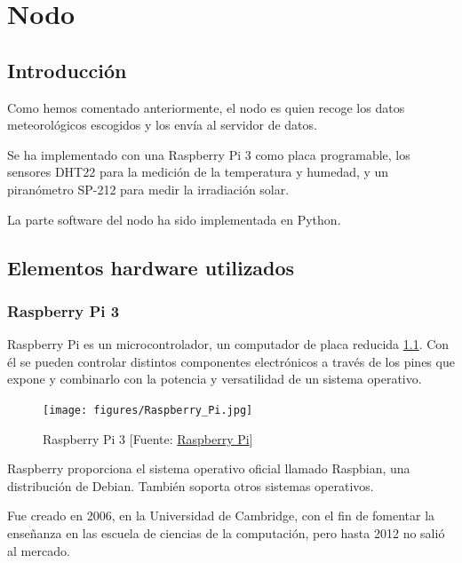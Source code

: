 \cleardoublepage

\chapter{Nodo}
\label{makereference3}

\section{Introducción}
\label{makereference3.1}
Como hemos comentado anteriormente, el nodo es quien recoge los datos meteorológicos escogidos y los envía al servidor de datos.

Se ha implementado con una Raspberry Pi 3 como placa programable, los sensores DHT22 para la medición de la temperatura y humedad, y un piranómetro SP-212 para medir la irradiación solar.

La parte software del nodo ha sido implementada en Python.

\section{Elementos hardware utilizados}
\label{makereference3.2}

\subsection{Raspberry Pi 3}
\label{makereference3.2.1}

Raspberry Pi es un microcontrolador, un computador de placa reducida \ref{rasp}. Con él se pueden controlar distintos componentes electrónicos a través de los pines que expone y combinarlo con la potencia y versatilidad de un sistema operativo.

\begin{figure}[htb]
	\begin{center}
		\texttt{[image: figures/Raspberry\_Pi.jpg]}
		\caption{Raspberry Pi 3 [Fuente: \href{https://www.raspberrypi.org}{Raspberry Pi}] \label{rasp}}
	\end{center}
\end{figure}

Raspberry proporciona el sistema operativo oficial llamado Raspbian, una distribución de Debian. También soporta otros sistemas operativos.
 
Fue creado en 2006, en la Universidad de Cambridge, con el fin de fomentar la enseñanza en las escuela de ciencias de la computación, pero hasta 2012 no salió al mercado.

